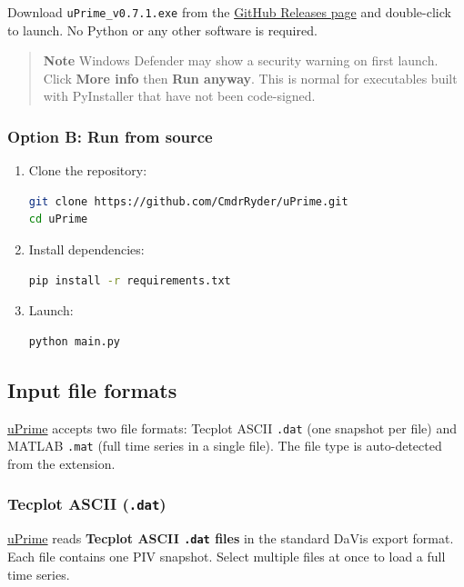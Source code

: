 Download \texttt{uPrime\_v0.7.1.exe} from the
\href{https://github.com/CmdrRyder/uPrime/releases}{GitHub Releases page}
and double-click to launch. No Python or any other software is required.

\begin{quote}
\textbf{Note}
Windows Defender may show a security warning on first launch. Click \textbf{More info} then \textbf{Run anyway}. This is normal for executables built with PyInstaller that have not been code-signed.
\end{quote}

\subsubsection{Option B: Run from source}

\begin{enumerate}[leftmargin=1.5em]
  \item Clone the repository:
\begin{lstlisting}[language=bash]
git clone https://github.com/CmdrRyder/uPrime.git
cd uPrime
\end{lstlisting}
  \item Install dependencies:
\begin{lstlisting}[language=bash]
pip install -r requirements.txt
\end{lstlisting}
  \item Launch:
\begin{lstlisting}[language=bash]
python main.py
\end{lstlisting}
\end{enumerate}

\subsection{Input file formats}
\label{sec:input}

\href{https://cmdrryder.github.io/uPrime/}{uPrime} accepts two file formats: Tecplot ASCII \texttt{.dat} (one snapshot per file) and MATLAB \texttt{.mat} (full time series in a single file). The file type is auto-detected from the extension.

\subsubsection{Tecplot ASCII (\texttt{.dat})}

\href{https://cmdrryder.github.io/uPrime/}{uPrime} reads \textbf{Tecplot ASCII \texttt{.dat} files} in the standard DaVis export format. Each file contains one PIV snapshot. Select multiple files at once to load a full time series.

